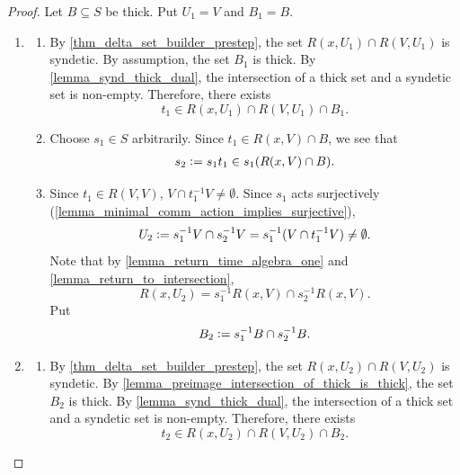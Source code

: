 \begin{proof}
    Let $B \subseteq S$ be thick. Put $U_1 = V$ and $B_1 = B$.

    \begin{enumerate}
        \item[Step 1]
        \begin{enumerate}
            \item By \cref{thm_delta_set_builder_prestep}, the set $R(x,U_1) \cap R(V,U_1)$ is syndetic.  By assumption, the set $B_1$ is thick. By \cref{lemma_synd_thick_dual}, the intersection of a thick set and a syndetic set is non-empty.  Therefore, there exists
            \[t_1 \in R(x,U_1) \cap R(V,U_1) \cap B_1.\]
            
            \item Choose $s_1 \in S$ arbitrarily. Since $t_1 \in R(x,V) \cap B$, we see that
            \begin{align}
                \label{eqn_delta_it_one}
                s_2 \vcentcolon= s_1t_1 \in s_1 (R(x,V) \cap B).
            \end{align}

            \item Since $t_1 \in R(V,V)$, $V \cap t_1^{-1} V \neq \emptyset$.  Since $s_1$ acts surjectively (\cref{lemma_minimal_comm_action_implies_surjective}),
            \[U_2 \vcentcolon= s_1^{-1} V \cap s_2^{-1} V = s_1^{-1} (V \cap t_1^{-1} V) \neq \emptyset.\]
            Note that by \cref{lemma_return_time_algebra_one} and \cref{lemma_return_to_intersection},
            \[R(x,U_2) = s_1^{-1} R(x,V) \cap s_2^{-1} R(x,V).\]
            Put
            \[B_2 \vcentcolon= s_1^{-1} B \cap s_2^{-1} B.\]
        \end{enumerate}

        \item[Step 2]
        \begin{enumerate}
            \item By \cref{thm_delta_set_builder_prestep}, the set $R(x,U_2) \cap R(V,U_2)$ is syndetic.  By \cref{lemma_preimage_intersection_of_thick_is_thick}, the set $B_2$ is thick. By \cref{lemma_synd_thick_dual}, the intersection of a thick set and a syndetic set is non-empty.  Therefore, there exists
            \[t_2 \in R(x,U_2) \cap R(V,U_2) \cap B_2.\]


\end{enumerate}
\end{enumerate}
\end{proof}
